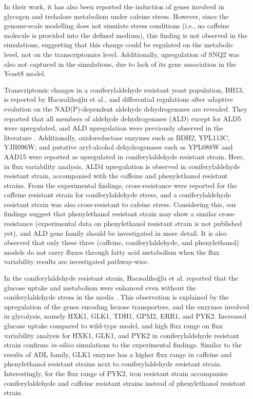 In their work, it has also been reported the induction of genes involved in glycogen and trehalose metabolism under cafeine stress. However, since the genome-scale modelling does not simulate stress conditions (i.e., no caffeine molecule is provided into the defined medium), this finding is not observed in the simulations, suggesting that this change could be regulated on the metabolic level, not on the transcriptomics level. Additionally, upregulation of SNQ2 was also not captured in the simulations, due to lack of its gene association in the Yeast8 model.

Transcriptomic changes in a coniferylaldehyde resistant yeast population, BH13, is reported by Hacısalihoğlu et al., and differential regulations after adaptive evolution on the NAD(P)-dependent aldehyde dehydrogenases are revealed. They reported that all members of aldehyde dehydrogenases (ALD) except for ALD5 were upregulated, and ALD upregulation were previously observed in the literature \cite{adeboye2015catabolism}. Additionally, oxidoreductase enzymes such as BDH2, YPL113C, YJR096W; and putative aryl-alcohol dehydrogenases such as YPL088W and AAD15 were reported as upregulated in coniferylaldehyde resistant strain. Here, in flux variability analysis, ALD4 upregulation is observed in coniferylaldehyde resistant strain, accompanied with the caffeine and phenylethanol resistant strains. From the experimental findings, cross-resistance were reported for the caffeine resistant strain for coniferylaldehyde stress, and a coniferylaldehyde resistant strain was also cross-resistant to cafeine stress. Considering this, our findings suggest that phenylethanol resistant strain may show a similar cross-resistance (experimental data on phenylethanol resistant strain is not published yet), and ALD gene family should be investigated in more detail. It is also observed that only these three (caffeine, coniferylaldehyde, and phenylethanol) models do not carry fluxes through fatty acid metabolism when the flux variability results are investigated pathway-wise.

In the coniferylaldehyde resistant strain, Hacısalihoğlu et al. reported that the glucose uptake and metabolism were enhanced even without the coniferylaldehyde stress in the media \cite{Hacsaliholu2019}. This observation is explained by the upregulation of the genes encoding hexose transporters, and the enzymes involved in glycolysis, namely HXK1, GLK1, TDH1, GPM2, ERR1, and PYK2. Increased glucose uptake compared to wild-type model, and high flux range on flux variability analysis for HXK1, GLK1, and PYK2 in coniferylaldehyde resistant strain confirms \emph{in-silico} simulations to the experimental findings. Similar to the results of ADL family, GLK1 enzyme has a higher flux range in caffeine and phenylethanol resistant strains next to coniferylaldehyde resistant strain. Interestingly, for the flux range of PYK2, iron resistant strain accompanies coniferylaldehyde and caffeine resistant strains instead of phenylethanol resistant strain.


